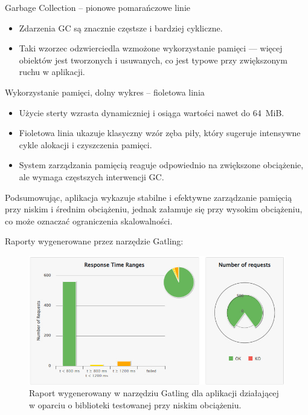 \documentclass[runningheads,12pt]{llncs}
\begin{document}
Garbage Collection – pionowe pomarańczowe linie

\begin{itemize}
  \item Zdarzenia GC są znacznie częstsze i bardziej cykliczne.
  \item Taki wzorzec odzwierciedla wzmożone wykorzystanie pamięci — więcej obiektów jest tworzonych i usuwanych, co jest typowe przy zwiększonym ruchu w aplikacji.
\end{itemize}

Wykorzystanie pamięci, dolny wykres – fioletowa linia

\begin{itemize}
  \item Użycie sterty wzrasta dynamiczniej i osiąga wartości nawet do 64~MiB.
  \item Fioletowa linia ukazuje klasyczny wzór zęba piły, który sugeruje intensywne cykle alokacji i czyszczenia pamięci.
  \item System zarządzania pamięcią reaguje odpowiednio na zwiększone obciążenie, ale wymaga częstszych interwencji GC.
\end{itemize}

Podsumowując, aplikacja wykazuje stabilne i efektywne zarządzanie pamięcią przy niskim i średnim obciążeniu, jednak załamuje się przy wysokim obciążeniu, co może oznaczać ograniczenia skalowalności.

\newpage

Raporty wygenerowane przez narzędzie Gatling:


\begin{figure}
    \centering
    \includegraphics[width=0.8\linewidth]{images/library-gatling-low-graph.jpg}
    \caption{Raport wygenerowany w narzędziu Gatling dla aplikacji działającej w oparciu o biblioteki testowanej przy niskim obciążeniu.}
    \label{fig:low}
\end{figure}
\end{document}

